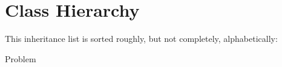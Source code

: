 \section{Class Hierarchy}
This inheritance list is sorted roughly, but not completely, alphabetically\+:\begin{DoxyCompactList}
\item Problem\begin{DoxyCompactList}
\item {}
\item {}
\end{DoxyCompactList}
\end{DoxyCompactList}
